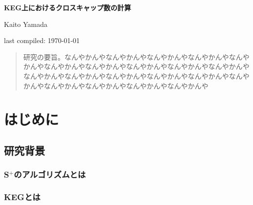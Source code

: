 \documentclass[11pt,a4j,draft]{jsreport}
\newcommand{\splus}{S${}^\text{+}$}
\begin{document}
\thispagestyle{empty}
\begin{center}

\vspace{40mm}
{\huge\noindent\textbf{KEG上におけるクロスキャップ数の計算}}\\
\vspace{20mm}

{\Large\vspace{\baselineskip}
Kaito Yamada\\
}
\vspace{100mm}

last compiled: \today\\

\end{center}

\thispagestyle{empty}
\clearpage


\begin{abstract}
    研究の要旨。なんやかんやなんやかんやなんやかんやなんやかんやなんやかんやなんやかんやなんやかんやなんやかんやなんやかんやなんやかんやなんやかんやなんやかんやなんやかんやなんやかんやなんやかんやなんやかんやなんやかんやなんやかんやなんやかんやなんやかんや
\end{abstract}


\tableofcontents

\pagestyle{plain}
\lhead{\rightmark}
\renewcommand{\chaptermark}[1]{\markboth{第\ \normalfont\thechapter\ 章~~#1}{}}


\chapter{はじめに} %

\section{研究背景} %
\subsection{\splus のアルゴリズムとは} %
\subsection{KEGとは} %
\end{document}
